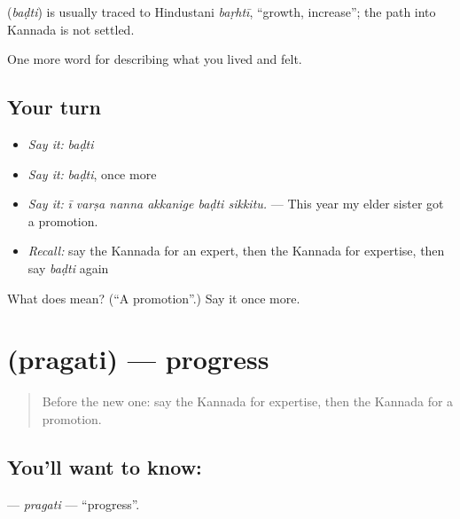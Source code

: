\begin{cousinweb}
\textbf{} (\emph{baḍti}) is usually traced to Hindustani \emph{baṛhtī}, \textquotedblleft{}growth, increase\textquotedblright{}; the path into Kannada is not settled.
\end{cousinweb}

\begin{grammarlens}[title={What you've built}]
One more word for describing what you lived and felt.
\end{grammarlens}

\subsection*{Your turn}
\begin{itemize}
\raggedright
  \item \emph{Say it:} \emph{baḍti}
  \item \emph{Say it:} \emph{baḍti}, once more
  \item \emph{Say it:} \emph{ī varṣa nanna akkanige baḍti sikkitu.} — This year my elder sister got a promotion.
  \item \emph{Recall:} say the Kannada for an expert, then the Kannada for expertise, then say \emph{baḍti} again
\end{itemize}

\begin{tcolorbox}[breakable,colback=teal!4,colframe=teal!35!black,title={Before you move on}]
What does  mean? (\textquotedblleft{}A promotion\textquotedblright{}.) Say it once more.
\end{tcolorbox}
\section[\texorpdfstring{\kn{ಪ್ರಗತಿ} (pragati)}{ಪ್ರಗತಿ (pragati)}]{ (pragati) — progress}

\label{lesson:KA-C517-pragati}



\begin{quote}
Before the new one: say the Kannada for expertise, then the Kannada for a promotion.
\end{quote}

\subsection*{You'll want to know: }
\textbf{} — \emph{pragati} — \textquotedblleft{}progress\textquotedblright{}.

